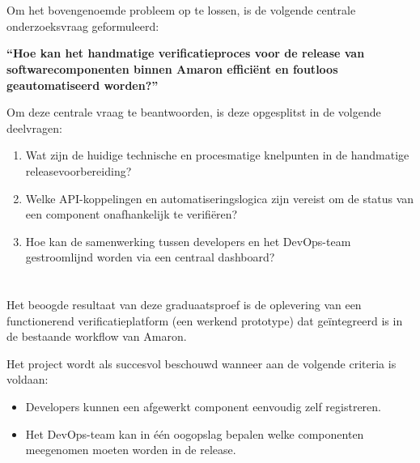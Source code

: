 \section{}%
\label{sec:onderzoeksvraag}

Om het bovengenoemde probleem op te lossen, is de volgende centrale onderzoeksvraag geformuleerd:

\textbf{``Hoe kan het handmatige verificatieproces voor de release van softwarecomponenten binnen Amaron efficiënt en foutloos geautomatiseerd worden?''}

Om deze centrale vraag te beantwoorden, is deze opgesplitst in de volgende deelvragen:

\begin{enumerate}
  \item Wat zijn de huidige technische en procesmatige knelpunten in de handmatige releasevoorbereiding?
  \item Welke API-koppelingen en automatiseringslogica zijn vereist om de status van een component onafhankelijk te verifiëren?
  \item Hoe kan de samenwerking tussen developers en het DevOps-team gestroomlijnd worden via een centraal dashboard?
\end{enumerate}

\section{}%
\label{sec:onderzoeksdoelstelling}

Het beoogde resultaat van deze graduaatsproef is de oplevering van een functionerend verificatieplatform (een werkend prototype) dat geïntegreerd is in de bestaande workflow van Amaron. 

Het project wordt als succesvol beschouwd wanneer aan de volgende criteria is voldaan:

\begin{itemize}
  \item Developers kunnen een afgewerkt component eenvoudig zelf registreren.
  \item Het DevOps-team kan in één oogopslag bepalen welke componenten meegenomen moeten worden in de release.
\end{itemize}

\section{}%
\label{sec:opzet-graduaatsproef}

